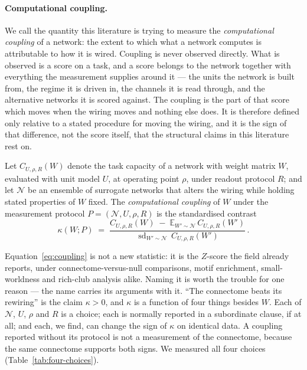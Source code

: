 \paragraph{Computational coupling.}
We call the quantity this literature is trying to measure the \emph{computational
coupling} of a network: the extent to which what a network computes is attributable to
how it is wired. Coupling is never observed directly. What is observed is a score on a
task, and a score belongs to the network together with everything the measurement
supplies around it --- the units the network is built from, the regime it is driven in,
the channels it is read through, and the alternative networks it is scored against. The
coupling is the part of that score which moves when the wiring moves and nothing else
does. It is therefore defined only relative to a stated procedure for moving the wiring,
and it is the sign of that difference, not the score itself, that the structural claims
in this literature rest on.

\begin{definition}
\label{def:coupling}
Let $C_{U,\rho,R}(W)$ denote the task capacity of a network with weight matrix $W$,
evaluated with unit model $U$, at operating point $\rho$, under readout protocol $R$;
and let $\mathcal{N}$ be an ensemble of surrogate networks that alters the wiring while
holding stated properties of $W$ fixed. The \emph{computational coupling} of $W$ under
the measurement protocol $P = (\mathcal{N}, U, \rho, R)$ is the standardised contrast
\begin{equation}
\label{eq:coupling}
\kappa(W; P) \;=\;
\frac{C_{U,\rho,R}(W) \;-\; \mathbb{E}_{W' \sim \mathcal{N}}\, C_{U,\rho,R}(W')}
     {\operatorname{sd}_{W' \sim \mathcal{N}}\, C_{U,\rho,R}(W')}\,.
\end{equation}
\end{definition}

\noindent
Equation~\ref{eq:coupling} is not a new statistic: it is the $Z$-score the field already
reports, under connectome-versus-null comparisons, motif enrichment, small-worldness and
rich-club analysis alike. Naming it is worth the trouble for one reason --- the name
carries its arguments with it. ``The connectome beats its rewiring'' is the claim
$\kappa > 0$, and $\kappa$ is a function of four things besides $W$. Each of
$\mathcal{N}$, $U$, $\rho$ and $R$ is a choice; each is normally reported in a
subordinate clause, if at all; and each, we find, can change the sign of $\kappa$ on
identical data. A coupling reported without its protocol is not a measurement of the
connectome, because the same connectome supports both signs. We measured all four
choices (Table~\ref{tab:four-choices}).

